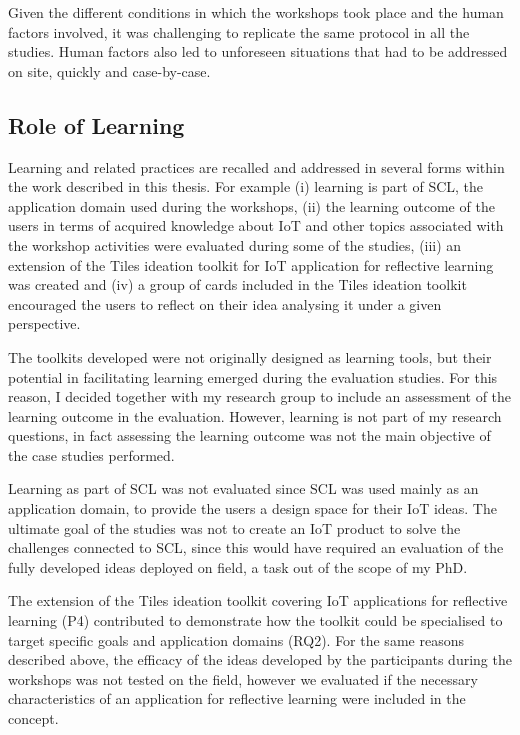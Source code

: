 Given the different conditions in which the workshops took place and the human factors involved, it was challenging to replicate the same protocol in all the studies. Human factors also led to unforeseen situations that had to be addressed on site, quickly and case-by-case.

\subsection{Role of Learning}
Learning and related practices are recalled and addressed in several forms within the work described in this thesis.
For example (i) learning is part of SCL, the application domain used during the workshops, (ii) the learning outcome of the users in terms of acquired knowledge about IoT and other topics associated with the workshop activities were evaluated during some of the studies, (iii) an extension of the Tiles ideation toolkit for IoT application for reflective learning was created and (iv) a group of cards included in the Tiles ideation toolkit encouraged the users to reflect on their idea analysing it under a given perspective.

The toolkits developed were not originally designed as learning tools, but their potential in facilitating learning emerged during the evaluation studies. For this reason, I decided together with my research group to include an assessment of the learning outcome in the evaluation. However, learning is not part of my research questions, in fact assessing the learning outcome was not the main objective of the case studies performed.

Learning as part of SCL was not evaluated since SCL was used mainly as an application domain, to provide the users a design space for their IoT ideas. The ultimate goal of the studies was not to create an IoT product to solve the challenges connected to SCL, since this would have required an evaluation of the fully developed ideas deployed on field, a task out of the scope of my PhD.

The extension of the Tiles ideation toolkit covering IoT applications for reflective learning (P4) contributed to demonstrate how the toolkit could be specialised to target specific goals and application domains (RQ2). For the same reasons described above, the efficacy of the ideas developed by the participants during the workshops was not tested on the field, however we evaluated if the necessary characteristics of an application for reflective learning were included in the concept.

